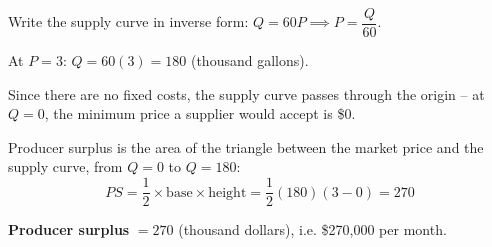 \documentclass{beamer}
\begin{document}
\begin{frame}


  \bigskip
  Write the supply curve in inverse form: $Q = 60P \implies P = \dfrac{Q}{60}$.

  \bigskip
  At $P=3$: $Q = 60(3) = 180$ (thousand gallons).

  \bigskip
  Since there are no fixed costs, the supply curve passes through the origin -- at $Q=0$, the minimum price a supplier would accept is \$0.

  \bigskip
  Producer surplus is the area of the triangle between the market price and the supply curve, from $Q=0$ to $Q=180$:
  $$
    PS = \frac{1}{2} \times \text{base} \times \text{height} = \frac{1}{2}(180)(3-0) = 270
  $$

  \textbf{Producer surplus} $= 270$ (thousand dollars), i.e. \$270,000 per month.
\end{frame}
\end{document}
